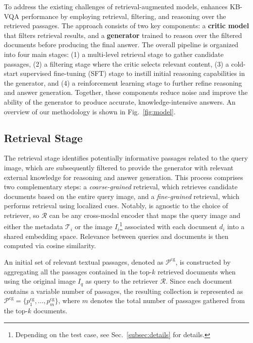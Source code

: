  To address the existing challenges of retrieval-augmented models, \textbf{\ours} enhances KB-VQA performance by employing retrieval, filtering, and reasoning over the retrieved passages. The approach consists of two key components: a \textbf{critic model} that filters retrieval results, and a \textbf{generator} trained to reason over the filtered documents before producing the final answer. The overall pipeline is organized into four main stages: (1) a multi-level retrieval stage to gather candidate passages, (2) a filtering stage where the critic selects relevant content, (3) a cold-start supervised fine-tuning (SFT) stage to instill initial reasoning capabilities in the generator, and (4) a reinforcement learning stage to further refine reasoning and answer generation. Together, these components reduce noise and improve the ability of the generator to produce accurate, knowledge-intensive answers. An overview of our methodology is shown in Fig.~\ref{fig:model}. 


\subsection{Retrieval Stage}
The retrieval stage identifies potentially informative passages related to the query image, which are subsequently filtered to provide the generator with relevant external knowledge for reasoning and answer generation. 
This process comprises two complementary steps: a \textit{coarse-grained} retrieval, which retrieves candidate documents based on the entire query image, and a \textit{fine-grained} retrieval, which performs retrieval using localized cues.
Notably, \ours is agnostic to the choice of retriever, so $\mathcal{R}$ can be any cross-modal encoder that maps the query image and either the metadata $\mathcal{T}_i$ or the image $I_i$\footnote{Depending on the test case, see Sec.~\ref{subsec:details} for details.} associated with each document $d_i$ into a shared embedding space. 
Relevance between queries and documents is then computed via cosine similarity.


An initial set of relevant textual passages, denoted as $\mathcal{P}^{\mathrm{cg}}$, is constructed by aggregating all the passages contained in the top-$k$ retrieved documents when using the original image $\mathit{I_q}$ as query to the retriever $\mathcal{R}$. Since each document contains a variable number of passages, the resulting collection is represented as $\mathcal{P}^{\mathrm{cg}} = \{p_1^{\mathrm{cg}}, \dots, p_m^{\mathrm{cg}}\}$, where $m$ denotes the total number of passages gathered from the top-$k$ documents. 


